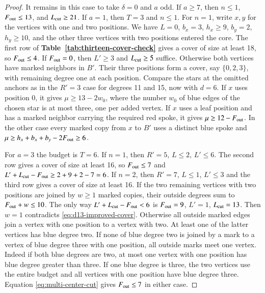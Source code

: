\documentclass[preprint,11pt,numbers]{elsarticle-arxiv}
\numberwithin{equation}{section}
\theoremstyle{definition}
\begin{document}
\begin{proof}
It remains in this case to take $\delta=0$ and $a$ odd. If $a\ge7$,
then $n\le1$, $F_{\rm out}\le13$, and $L_{\rm cut}\ge21$.
If $a=1$, then $T=3$ and $n\le1$. For $n=1$, write $x,y$ for the
vertices with one and two positions. We have $L=0$, $b_x=3$,
$h_x\ge9$, $b_y=2$, $h_y\ge10$, and the other three vertices
with two positions entered the core. The first row of \textbf{Table~\ref{tab:thirteen-cover-check}}
gives a cover of size at least 18, so $F_{\rm out}\le4$. If
$F_{\rm out}=0$, then $L'\ge3$ and $L_{\rm cut}\ge5$ suffice.
Otherwise both vertices have marked neighbors in $B'$. Their three
positions form a cover, say $\{0,2,3\}$, with remaining degree one
at each position. Compare the stars at the omitted anchors as in the $R'=3$ case
for degrees 11 and 15, now with $d=6$. If $x$ uses position 0, it gives
$\mu\ge13-2w_0$, where the number $w_0$ of blue edges of the
chosen star is at most three, one per added vertex. If $x$ uses a
leaf position and has a marked neighbor carrying the required red
spoke, it gives $\mu\ge12-F_{\rm out}$. In the other case every
marked copy from $x$ to $B'$ uses a distinct blue spoke and
$\mu\ge h_x+b_x+b_y-2F_{\rm out}\ge6$.

For $a=3$ the budget is $T=6$. If $n=1$, then $R'=5$, $L\le2$,
$L'\le6$. The second row gives a cover of size at least 16, so
$F_{\rm out}\le7$ and $L'+L_{\rm cut}-F_{\rm out}\ge2+9+2-7=6$.
If $n=2$, then $R'=7$, $L\le1$, $L'\le3$ and the third row gives
a cover of size at least 16. If the two remaining vertices with two
positions are joined by $w\ge1$ marked copies, their outside degrees
sum to $F_{\rm out}+w\le10$. The only way
$L'+L_{\rm cut}-F_{\rm out}<6$ is $F_{\rm out}=9$, $L'=1$,
$L_{\rm cut}=13$. Then $w=1$ contradicts
\eqref{eq:d13-improved-cover}. Otherwise all outside marked edges
join a vertex with one position to a vertex with two. At least one
of the latter vertices has blue degree two. If none of blue degree
two is joined by a mark to a vertex of blue degree three with one
position, all outside marks meet one vertex. Indeed if both blue
degrees are two, at most one vertex with one position has blue
degree greater than three. If one blue degree is three, the two
vertices use the entire budget and all vertices with one position
have blue degree three. Equation \eqref{eq:multi-center-cut} gives
$F_{\rm out}\le7$ in either case.


\end{proof}
\end{document}
